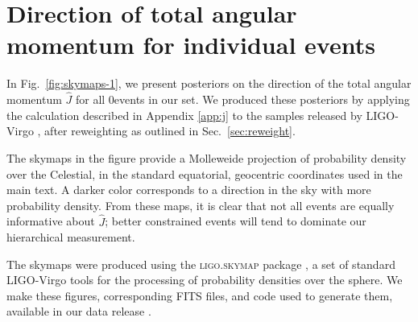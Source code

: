 \documentclass[aps,prd,twocolumn,superscriptaddress,preprintnumbers,floatfix,nofootinbib]{revtex4-2}
\newcommand{\Nevents}{0}
\begin{document}
\section{Direction of total angular momentum for individual events}
\label{app:skymaps}

In Fig.~\ref{fig:skymaps-1}, we present posteriors on the direction of the total angular momentum $\hat{J}$ for all \Nevents events in our set.
We produced these posteriors by applying the calculation described in Appendix \ref{app:j} to the samples released by LIGO-Virgo \cite{zenodo:GWTC-2.1,zenodo:GWTC-3}, after reweighting as outlined in Sec.~\ref{sec:reweight}.

The skymaps in the figure provide a Molleweide projection of probability density over the Celestial, in the standard equatorial, geocentric coordinates used in the main text.
A darker color corresponds to a direction in the sky with more probability density.
From these maps, it is clear that not all events are equally informative about $\hat{J}$; better constrained events will tend to dominate our hierarchical measurement.

The skymaps were produced using the \textsc{ligo.skymap} package \cite{skymap,Singer:2016eax,Singer:2016erz}, a set of standard LIGO-Virgo tools for the processing of probability densities over the sphere.
We make these figures, corresponding \ac{FITS} files, and code used to generate them, available in our data release \cite{repo}.

{\marginicon{} }


\end{document}
